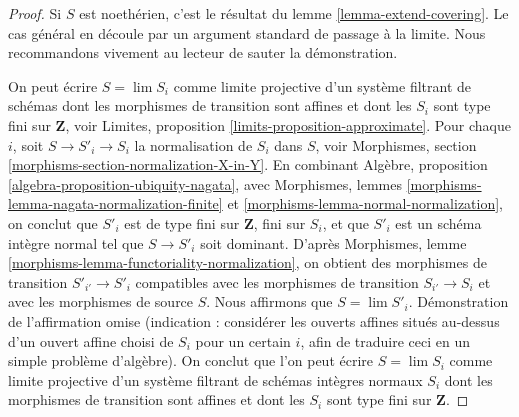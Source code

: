 \begin{proof}
Si $S$ est noethérien, c'est le résultat du
lemme \ref{lemma-extend-covering}. Le cas général
en découle par un argument standard de passage à la limite.
Nous recommandons vivement au lecteur de sauter la démonstration.

\medskip\noindent
On peut écrire $S = \lim S_i$ comme limite projective d'un système filtrant
de schémas dont les morphismes de transition sont affines et dont les $S_i$ sont
type fini sur $\mathbf{Z}$, voir
Limites, proposition \ref{limits-proposition-approximate}.
Pour chaque $i$, soit $S \to S'_i \to S_i$ la normalisation
de $S_i$ dans $S$, voir
Morphismes, section \ref{morphisms-section-normalization-X-in-Y}.
En combinant Algèbre, proposition \ref{algebra-proposition-ubiquity-nagata},
avec Morphismes, lemmes \ref{morphisms-lemma-nagata-normalization-finite} et
\ref{morphisms-lemma-normal-normalization},
on conclut que $S'_i$ est de type fini sur $\mathbf{Z}$,
fini sur $S_i$, et que $S'_i$ est un schéma intègre normal
tel que $S \to S'_i$ soit dominant.
D'après Morphismes, lemme \ref{morphisms-lemma-functoriality-normalization},
on obtient des morphismes de transition $S'_{i'} \to S'_i$ compatibles
avec les morphismes de transition $S_{i'} \to S_i$ et avec
les morphismes de source $S$.
Nous affirmons que $S = \lim S'_i$. Démonstration de l'affirmation omise (indication :
considérer les ouverts affines situés au-dessus d'un ouvert affine choisi de $S_i$
pour un certain $i$, afin de traduire ceci en un simple problème
d'algèbre). On conclut que l'on peut écrire $S = \lim S_i$
comme limite projective d'un système filtrant de schémas intègres normaux $S_i$
dont les morphismes de transition sont affines et dont les $S_i$ sont
type fini sur $\mathbf{Z}$.


\end{proof}
